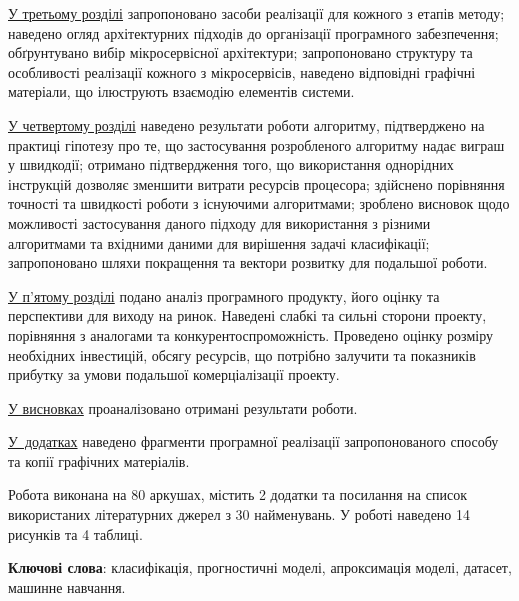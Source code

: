 \documentclass[a4paper,14pt]{extarticle}
\begin{document}
\underline{У третьому розділі} запропоновано засоби реалізації для кожного з етапів методу; наведено огляд архітектурних підходів до організації програмного забезпечення; обґрунтувано вибір мікросервісної архітектури; запропоновано структуру та особливості реалізації кожного з мікросервісів, наведено відповідні графічні матеріали, що ілюструють взаємодію елементів системи.

\underline{У четвертому розділі} наведено результати роботи алгоритму, підтверджено на практиці гіпотезу про те, що застосування розробленого алгоритму надає виграш у швидкодії; отримано підтвердження того, що використання однорідних інструкцій дозволяє зменшити витрати ресурсів процесора; здійснено порівняння точності та швидкості роботи з існуючими алгоритмами; зроблено висновок щодо можливості застосування даного підходу для використання з різними алгоритмами та вхідними даними для вирішення задачі класифікації; запропоновано шляхи покращення та вектори розвитку для подальшої роботи.

\underline{У п'ятому розділі} подано аналіз програмного продукту, його оцінку та перспективи для виходу на ринок. Наведені слабкі та сильні сторони проекту, порівняння з аналогами та конкурентоспроможність. Проведено оцінку розміру необхідних інвестицій, обсягу ресурсів, що потрібно залучити та показників прибутку за умови подальшої комерціалізації проекту.

\underline{У висновках} проаналізовано отримані результати роботи.

\underline{У додатках} наведено фрагменти програмної реалізації запропонованого способу та копії графічних матеріалів.

Робота виконана на  80 аркушах, містить 2 додатки та посилання на список використаних літературних джерел з 30 найменувань. У роботі наведено 14 рисунків та 4 таблиці.

\textbf{Ключові слова}: класифікація, прогностичні моделі, апроксимація моделі, датасет, машинне навчання.
\end{document}
